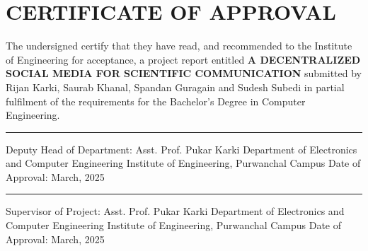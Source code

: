 \section*{\Large CERTIFICATE OF APPROVAL}
The undersigned certify that they have read, and recommended to the Institute of Engineering
for acceptance, a project report entitled \textbf{A DECENTRALIZED SOCIAL MEDIA FOR SCIENTIFIC COMMUNICATION} submitted by Rijan Karki, Saurab Khanal, Spandan Guragain and Sudesh Subedi in partial fulfilment of the requirements for the Bachelor’s Degree in Computer Engineering.\newline\newline\newline
\rule{5cm}{0.4pt} %
\newline
Deputy Head of Department: Asst. Prof. Pukar Karki\newline
Department of Electronics and Computer Engineering\newline
Institute of Engineering, Purwanchal Campus\newline
Date of Approval: March, 2025
\newline\newline\newline
\rule{5cm}{0.4pt} %
\newline
Supervisor of Project: Asst. Prof. Pukar Karki\newline
Department of Electronics and Computer Engineering\newline
Institute of Engineering, Purwanchal Campus\newline
Date of Approval: March, 2025
\newline\newline
